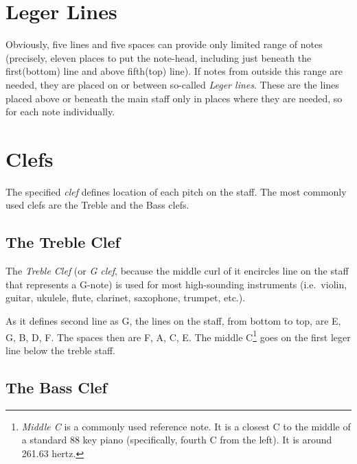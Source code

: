 

\section{Leger Lines}\label{sec:leger_lines}
Obviously, five lines and five spaces can provide only limited range of notes (precisely, eleven places to put
the note-head, including just beneath the first(bottom) line and above fifth(top) line). If notes from outside this
range are needed, they are placed on or between so-called \textit{Leger lines}. These are the lines placed above or
beneath the main staff only in places where they are needed, so for each note individually.


\section{Clefs}\label{sec:clefs}

The specified \textit{clef} defines location of each pitch on the staff. The most commonly used clefs are the Treble and
the Bass clefs\cite{an-explanation-of-clefs}.

\subsection{The Treble Clef}\label{subsec:the-treble-clef}

The \textit{Treble Clef} (or \textit{G clef}, because the middle curl of it encircles line on the staff that represents a
G-note) is used for most high-sounding instruments (i.e.\ violin, guitar, ukulele, flute, clarinet, saxophone, trumpet,
etc.).


As it defines second line as G, the lines on the staff, from bottom to top, are E, G, B, D, F. The spaces then
are F, A, C, E\@. The middle C\footnote{\textit{Middle C} is a commonly used reference note. It is a closest C to
the middle of a standard 88 key piano (specifically, fourth C from the left). It is around 261.63 hertz.} goes on
the first leger line below the treble staff.

\subsection{The Bass Clef}\label{subsec:the-bass-clef}

